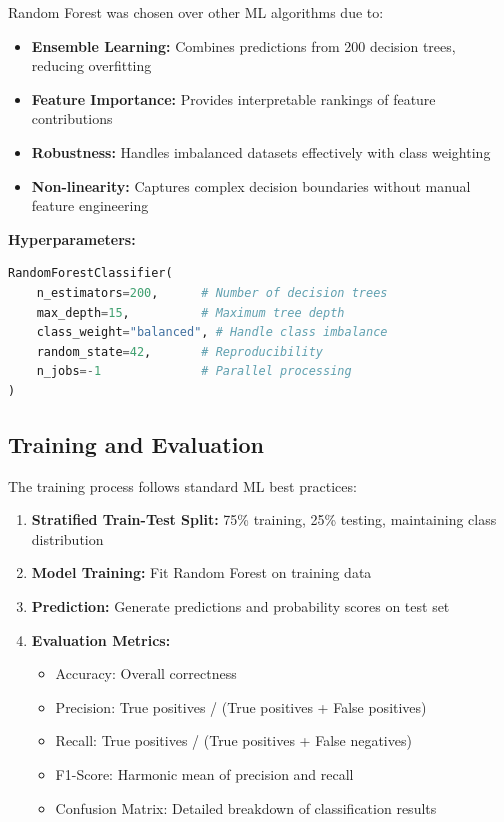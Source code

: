 \documentclass[12pt,a4paper]{article}
\begin{document}
Random Forest was chosen over other ML algorithms due to:

\begin{itemize}
    \item \textbf{Ensemble Learning:} Combines predictions from 200 decision trees, reducing overfitting
    \item \textbf{Feature Importance:} Provides interpretable rankings of feature contributions
    \item \textbf{Robustness:} Handles imbalanced datasets effectively with class weighting
    \item \textbf{Non-linearity:} Captures complex decision boundaries without manual feature engineering
\end{itemize}

\textbf{Hyperparameters:}
\begin{lstlisting}[language=Python]
RandomForestClassifier(
    n_estimators=200,      # Number of decision trees
    max_depth=15,          # Maximum tree depth
    class_weight="balanced", # Handle class imbalance
    random_state=42,       # Reproducibility
    n_jobs=-1              # Parallel processing
)
\end{lstlisting}

\subsection{Training and Evaluation}

The training process follows standard ML best practices:

\begin{enumerate}
    \item \textbf{Stratified Train-Test Split:} 75\% training, 25\% testing, maintaining class distribution
    \item \textbf{Model Training:} Fit Random Forest on training data
    \item \textbf{Prediction:} Generate predictions and probability scores on test set
    \item \textbf{Evaluation Metrics:}
    \begin{itemize}
        \item Accuracy: Overall correctness
        \item Precision: True positives / (True positives + False positives)
        \item Recall: True positives / (True positives + False negatives)
        \item F1-Score: Harmonic mean of precision and recall
        \item Confusion Matrix: Detailed breakdown of classification results
    \end{itemize}
\end{enumerate}
\end{document}
